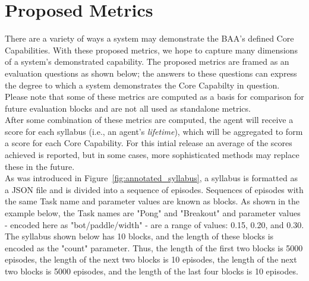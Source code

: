 \chapter{Proposed Metrics}\label{ch:metrics_syllabus}

There are a variety of ways a system may demonstrate the BAA's defined Core Capabilities. With these proposed metrics, we hope to capture many dimensions of a system's demonstrated capability. The proposed metrics are framed as an evaluation questions as shown below; the answers to these questions can express the degree to which a system demonstrates the Core Capabilty in question. Please note that some of these metrics are computed as a basis for comparison for future evaluation blocks and are not all used as standalone metrics. \\[0.1in]

After some combination of these metrics are computed, the agent will receive a score for each syllabus (i.e., an agent's \textit{lifetime}), which will be aggregated to form a score for each Core Capability. For this intial release an average of the scores achieved is reported, but in some cases, more sophisticated methods may replace these in the future.\\[0.2in]

As was introduced in Figure~\ref{fig:annotated_syllabus}, a syllabus is formatted as a JSON file and is divided into a sequence of episodes. Sequences of episodes with the same Task name and parameter values are known as blocks. As shown in the example below, the Task names are "Pong" and "Breakout" and parameter values - encoded here as "bot/paddle/width" - are a range of values: 0.15, 0.20, and 0.30. The syllabus shown below has 10 blocks, and the length of these blocks is encoded as the "count" parameter. Thus, the length of the first two blocks is 5000 episodes, the length of the next two blocks is 10 episodes, the length of the next two blocks is 5000 episodes, and the length of the last four blocks is 10 episodes.

